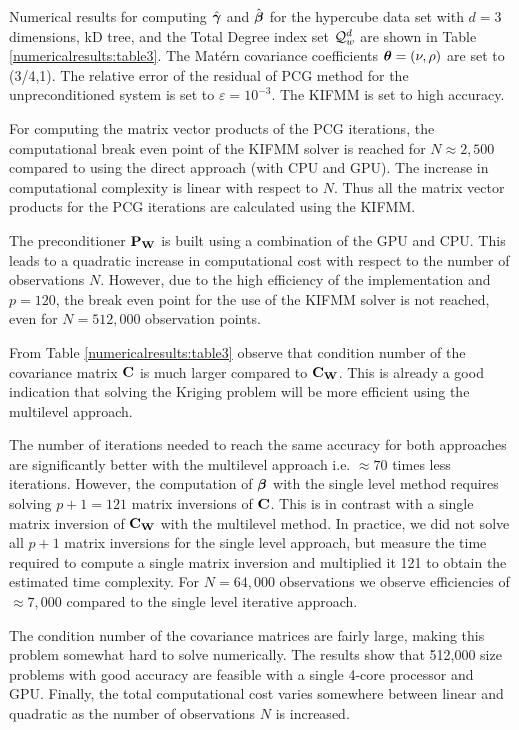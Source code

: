 \documentclass[11pt,final]{amsart}       %
\begin{document}
Numerical results for computing $\hat {\boldsymbol{\gamma}}$ and $\hat {\boldsymbol{\beta}}$ for the
hypercube data set with $d = 3$ dimensions, kD tree, and the Total
Degree index set ${\mathcal Q}^d_w$ are shown in Table
\ref{numericalresults:table3}. The Mat\'{e}rn covariance coefficients
$\boldsymbol{\theta} = (\nu,\rho)$ are set to (3/4,1). The relative error of the
residual of PCG method for the unpreconditioned system is set to
$\varepsilon = 10^{-3}$. The KIFMM is set to high accuracy.

For computing the matrix vector products of the PCG iterations, the
computational break even point of the KIFMM solver is reached for $N
\approx 2,500$ compared to using the direct approach (with CPU and
GPU). The increase in computational complexity is linear with respect
to $N$. Thus all the matrix vector products for the PCG iterations are
calculated using the KIFMM.

The preconditioner $\mathbf{P}_{\mathbf{W}}$ is built using a combination of the GPU
and CPU. This leads to a quadratic increase in computational cost with
respect to the number of observations $N$. However, due to the high
efficiency of the implementation and $p = 120$, the break even point
for the use of the KIFMM solver is not reached, even for $N = 512,000$
observation points.

From Table \ref{numericalresults:table3} observe that condition number
of the covariance matrix $\mathbf{C}$ is much larger compared to
$\mathbf{C}_{\mathbf{W}}$. This is already a good indication that solving the
Kriging problem will be more efficient using the multilevel approach.

The number of iterations needed to reach the same accuracy for both
approaches are significantly better with the multilevel approach
i.e. $\approx 70$ times less iterations. However, the computation of
$\boldsymbol{\beta}$ with the single level method requires solving $p + 1 = 121$
matrix inversions of $\mathbf{C}$. This is in contrast with a single matrix
inversion of $\mathbf{C}_{\mathbf{W}}$ with the multilevel method. In practice, we
did not solve all $p+1$ matrix inversions for the single level
approach, but measure the time required to compute a single matrix
inversion and multiplied it 121 to obtain the estimated time
complexity.  For $N = 64,000$ observations we observe efficiencies of
$\approx 7,000$ compared to the single level iterative approach.

The condition number of the covariance matrices are fairly large,
making this problem somewhat hard to solve numerically.  The results
show that 512,000 size problems with good accuracy are feasible with a
single 4-core processor and GPU. Finally, the total computational cost
varies somewhere between linear and quadratic as the number of
observations $N$ is increased.
\end{document}
